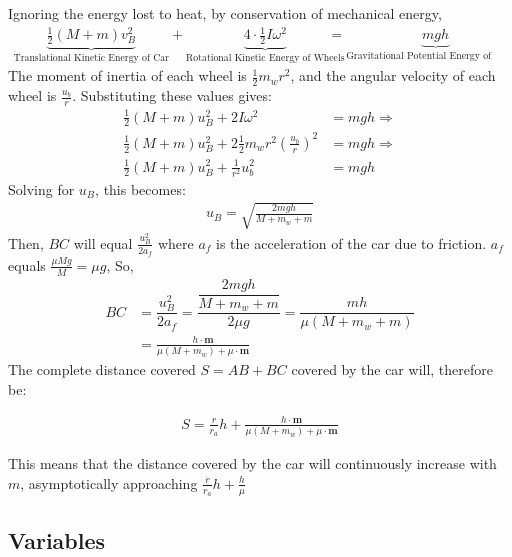 \documentclass[titlepage,12pt]{article}
\begin{document}
Ignoring the energy lost to heat, by conservation of mechanical energy,
%
\begin{align*}
    \underbrace{\frac{1}{2}(M+m)v_B^2}_{\text{Translational Kinetic Energy of Car}} +
    \underbrace{4\cdot\frac{1}{2}I\omega^2}_{\text{Rotational Kinetic Energy of Wheels}} &=
    \underbrace{mgh}_{\text{Gravitational Potential Energy of Weight}}
\end{align*}
%
The moment of inertia of each wheel is $\frac{1}{2}m_wr^2$, and the angular velocity of each
wheel is $\frac{u_b}{r}$. Substituting these values gives:
%
\begin{align*}
    \frac{1}{2}(M+m)u_B^2 + 2I\omega^2                          &= mgh \Rightarrow \\
    \frac{1}{2}(M+m)u_B^2 + 2\frac{1}{2}m_wr^2(\frac{u_b}{r})^2 &= mgh \Rightarrow \\
    \frac{1}{2}(M+m)u_B^2 + \frac{1}{r^2}u_b^2 &= mgh
\end{align*}
%
Solving for $u_B$, this becomes:
%
\begin{align*}
    u_B = \sqrt{\frac{2mgh}{M+m_w+m}}
\end{align*}
%
Then, $BC$ will equal $\frac{u_B^2}{2a_f}$ where $a_f$ is the acceleration of the car due to
friction. $a_f$ equals $\frac{\mu M g}{M} = \mu g$, So, 
%
\begin{align*}
    BC &= \dfrac{u_B^2}{2a_f} = \dfrac{\dfrac{2mgh}{M+m_w+m}}{2\mu g}
                             = \dfrac{mh}{\mu(M+m_w+m)} \\
       &= \frac{h\cdot \mathbf{m}}{\mu(M+m_w) + \mu \cdot \textbf{m}}
\end{align*}
%
The complete distance covered $S=AB+BC$ covered by the car will, therefore be: 
%
\begin{framed}
    \begin{equation} \label{eq:s_formula}
    \begin{aligned}
        S = \frac{r}{r_a}h + \frac{h\cdot \mathbf{m}}{\mu(M+m_w) + \mu \cdot \textbf{m}}
    \end{aligned}
    \end{equation}
\end{framed}
%
This means that the distance covered by the car will continuously increase with $m$,
asymptotically approaching $\frac{r}{r_a}h + \frac{h}{\mu}$

\subsection{Variables}
\end{document}

